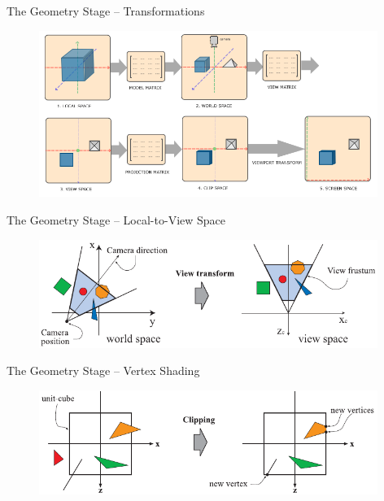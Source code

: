 \documentclass{beamer}
\begin{document}
\begin{frame}{The Geometry Stage -- Transformations}

	\begin{figure}[t]
		\includegraphics[width=11cm]{coordinate-systems}
		\centering
	\end{figure}

\end{frame}

\begin{frame}{The Geometry Stage -- Local-to-View Space}

	\begin{figure}[t]
		\includegraphics[width=11cm]{view-transform}
		\centering
	\end{figure}

\end{frame}

\begin{frame}{The Geometry Stage -- Vertex Shading}

	\begin{figure}[t]
		\includegraphics[width=11cm]{clipping}
		\centering
	\end{figure}

\end{frame}
\end{document}

